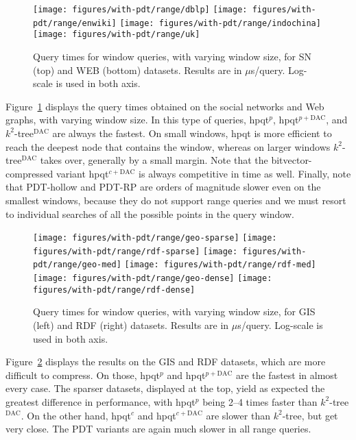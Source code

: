 \documentclass{elsarticle}
\newcommand{\DAC}{\ensuremath{\mathrm{DAC}}}
\newcommand{\kt}{$k^2$-tree\xspace}
\newcommand{\ktdac}{$k^2$-tree$^{\DAC}$\xspace}
\newcommand{\hpqt}{\textsf{hpqt}\xspace}
\newcommand{\hpqtp}{\textsf{hpqt$^p$}\xspace}
\newcommand{\hpqtR}{\textsf{hpqt$^{c}$}\xspace}
\newcommand{\hpqtpdac}{\textsf{hpqt$^{p+\DAC}$}\xspace}
\newcommand{\hpqtRdac}{\textsf{hpqt$^{c+\DAC}$}\xspace}
\newcommand{\pdt}{PDT\xspace}
\newcommand{\pdth}{PDT-hollow\xspace}
\newcommand{\pdtrp}{PDT-RP\xspace}
\begin{document}
\begin{figure}[t]
 \centering
     \texttt{[image: figures/with-pdt/range/dblp]}
    \texttt{[image: figures/with-pdt/range/enwiki]}
    \texttt{[image: figures/with-pdt/range/indochina]}
    \texttt{[image: figures/with-pdt/range/uk]}
    \caption{Query times for window queries, with varying window size, for SN (top) and WEB (bottom) datasets. Results are in $\mu$s/query. Log-scale is used in both axis.}
  \label{fig:rangeSW}
\end{figure}

Figure~\ref{fig:rangeSW} displays the query times obtained on the social networks and Web graphs, with varying window size. In this type of queries, \hpqtp, \hpqtpdac, and \ktdac are always the fastest. On small windows, \hpqt is more efficient to reach the deepest node that contains the window, whereas on larger windows \ktdac takes over, generally by a small margin. Note that the bitvector-compressed variant \hpqtRdac is always competitive in time as well. Finally, note that \pdth and \pdtrp are orders of magnitude slower even on the smallest windows, because they do not support range queries and we must resort to individual searches of all the possible points in the query window. 



\begin{figure}[t!]
 \centering
    \texttt{[image: figures/with-pdt/range/geo-sparse]}
    \texttt{[image: figures/with-pdt/range/rdf-sparse]}
    \texttt{[image: figures/with-pdt/range/geo-med]}
    \texttt{[image: figures/with-pdt/range/rdf-med]}
    \texttt{[image: figures/with-pdt/range/geo-dense]}
    \texttt{[image: figures/with-pdt/range/rdf-dense]}
  \caption{Query times for window queries, with varying window size, for GIS (left) and RDF (right) datasets. Results are in $\mu$s/query. Log-scale is used in both axis.}
  \label{fig:rangeGR}
\end{figure}

Figure~\ref{fig:rangeGR} displays the results on the GIS and RDF datasets, which are more difficult to compress. On those, \hpqtp and \hpqtpdac are the fastest in almost every case. The sparser datasets, displayed at the top, yield as expected the greatest difference in performance, with \hpqtp being 2--4 times faster than \ktdac. On the other hand, \hpqtR and \hpqtRdac are slower than \kt, but get very close. The \pdt variants are again much slower in all range queries.
\end{document}
